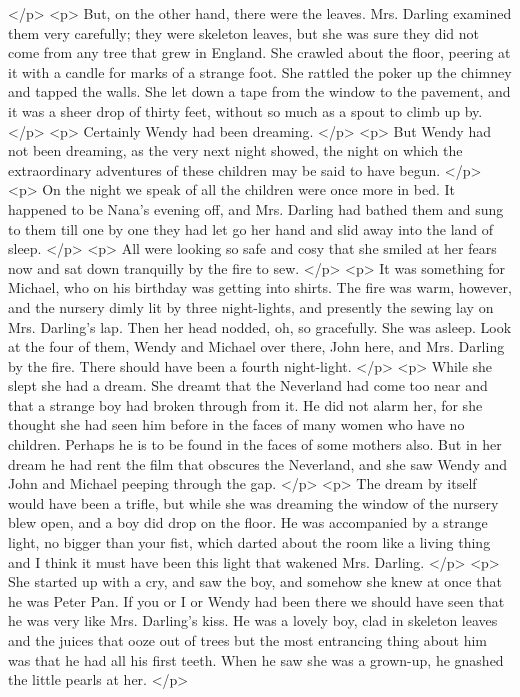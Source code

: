    </p>
    <p>
      But, on the other hand, there were the leaves. Mrs. Darling examined them
      very carefully; they were skeleton leaves, but she was sure they did not
      come from any tree that grew in England. She crawled about the floor,
      peering at it with a candle for marks of a strange foot. She rattled the
      poker up the chimney and tapped the walls. She let down a tape from the
      window to the pavement, and it was a sheer drop of thirty feet, without so
      much as a spout to climb up by.
    </p>
    <p>
      Certainly Wendy had been dreaming.
    </p>
    <p>
      But Wendy had not been dreaming, as the very next night showed, the night
      on which the extraordinary adventures of these children may be said to
      have begun.
    </p>
    <p>
      On the night we speak of all the children were once more in bed. It
      happened to be Nana's evening off, and Mrs. Darling had bathed them and
      sung to them till one by one they had let go her hand and slid away into
      the land of sleep.
    </p>
    <p>
      All were looking so safe and cosy that she smiled at her fears now and sat
      down tranquilly by the fire to sew.
    </p>
    <p>
      It was something for Michael, who on his birthday was getting into shirts.
      The fire was warm, however, and the nursery dimly lit by three
      night-lights, and presently the sewing lay on Mrs. Darling's lap. Then her
      head nodded, oh, so gracefully. She was asleep. Look at the four of them,
      Wendy and Michael over there, John here, and Mrs. Darling by the fire.
      There should have been a fourth night-light.
    </p>
    <p>
      While she slept she had a dream. She dreamt that the Neverland had come
      too near and that a strange boy had broken through from it. He did not
      alarm her, for she thought she had seen him before in the faces of many
      women who have no children. Perhaps he is to be found in the faces of some
      mothers also. But in her dream he had rent the film that obscures the
      Neverland, and she saw Wendy and John and Michael peeping through the gap.
    </p>
    <p>
      The dream by itself would have been a trifle, but while she was dreaming
      the window of the nursery blew open, and a boy did drop on the floor. He
      was accompanied by a strange light, no bigger than your fist, which darted
      about the room like a living thing and I think it must have been this
      light that wakened Mrs. Darling.
    </p>
    <p>
      She started up with a cry, and saw the boy, and somehow she knew at once
      that he was Peter Pan. If you or I or Wendy had been there we should have
      seen that he was very like Mrs. Darling's kiss. He was a lovely boy, clad
      in skeleton leaves and the juices that ooze out of trees but the most
      entrancing thing about him was that he had all his first teeth. When he
      saw she was a grown-up, he gnashed the little pearls at her.
    </p>
